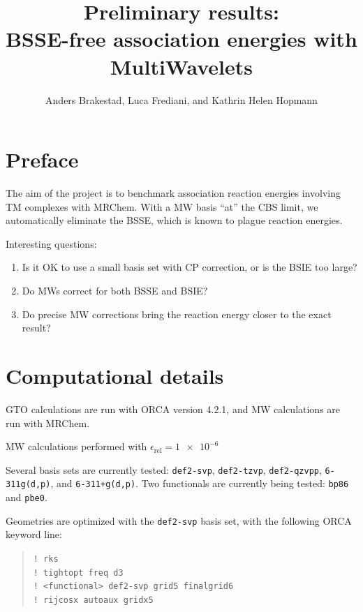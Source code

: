 \documentclass[11pt,a4paper]{article}
\author{Anders Brakestad, Luca Frediani, and Kathrin Helen Hopmann}
\title{Preliminary results: \\ BSSE-free association energies with MultiWavelets}
\begin{document}
	\maketitle
	
\section*{Preface}
The aim of the project is to benchmark association reaction energies involving TM complexes with MRChem.
With a MW basis ``at'' the CBS limit, we automatically eliminate the BSSE, which is known to plague reaction energies.

Interesting questions:

\begin{enumerate}
	\item Is it OK to use a small basis set with CP correction, or is the BSIE too large?
	\item Do MWs correct for both BSSE and BSIE? 
	\item Do precise MW corrections bring the reaction energy closer to the exact result?
\end{enumerate}

\section*{Computational details}
GTO calculations are run with ORCA version 4.2.1, and MW calculations are run with MRChem.

MW calculations performed with $\epsilon_{\text{rel}} = \num{1e-6}$

Several basis sets are currently tested: \verb|def2-svp|, \verb|def2-tzvp|, \verb|def2-qzvpp|, \verb|6-311g(d,p)|, and \verb|6-311+g(d,p)|.
Two functionals are currently being tested: \verb|bp86| and \verb|pbe0|.

Geometries are optimized with the \verb|def2-svp| basis set, with the following ORCA keyword line:

\begin{quote}
	\verb|! rks| \\
	\verb|! tightopt freq d3| \\
	\verb|! <functional> def2-svp grid5 finalgrid6| \\ 
	\verb|! rijcosx autoaux gridx5|
\end{quote}
\end{document}

